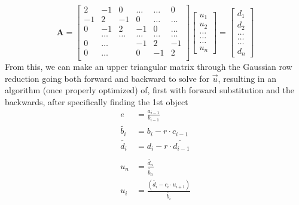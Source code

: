 \documentclass[10pt, twocolumn]{revtex4-1}
\begin{document}
 \[
\mathbf{A} = \begin{bmatrix}
                    2& -1& 0 &\dots   & \dots &0 \\
                    -1 & 2 & -1 &0 &\dots &\dots \\
                    0&-1 &2 & -1 & 0 & \dots \\
                    & \dots   & \dots &\dots   &\dots & \dots \\
                    0&\dots   &  &-1 &2& -1 \\
                    0&\dots    &  & 0  &-1 & 2 \\
              \end{bmatrix}
              \begin{bmatrix}
              		u_1 \\
              		u_2 \\
              		\dots \\
              		\dots \\
              		\dots \\
              		u_n
              \end{bmatrix} =
			  \begin{bmatrix}
              		d_1 \\
              		d_2 \\
              		\dots \\
              		\dots \\
              		\dots \\
              		d_n
              \end{bmatrix}              
\]
From this, we can make an upper triangular matrix through the Gaussian row reduction going both forward and backward to solve for $\vec{u}$, resulting in an algorithm (once properly optimized) of, first with forward substitution and the backwards, after specifically finding the 1st object 
\begin{equation*}
	\begin{aligned}
		e &= \frac{a_{i-1}}{b_{i-1}} \\
		\tilde{b_i} &= b_i - r\cdot c_{i-1} \\
		\tilde{d_i} &= d_i - r\cdot\tilde{d_{i-1}} \\ \\
		u_n &= \frac{\tilde{d_n}}{\tilde{b_n}} \\
		u_i &= \frac{(\tilde{d_i} - c_i\cdot u_{i+1})}{\tilde{b_i}}
	\end{aligned}
\end{equation*}
\end{document}
